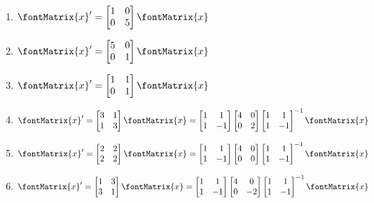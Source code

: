 \begin{enumerate}[label=(\alph*)]
\item\label{itm : Quiz19 a} $\displaystyle \fontMatrix{x}' = \begin{bmatrix}1&0\\0&5\end{bmatrix} \fontMatrix{x}$
\item\label{itm : Quiz19 b} $\displaystyle \fontMatrix{x}' = \begin{bmatrix}5&0\\0&1\end{bmatrix} \fontMatrix{x}$
\item\label{itm : Quiz19 c} $\displaystyle \fontMatrix{x}' = \begin{bmatrix}1&1\\0&1\end{bmatrix} \fontMatrix{x}$
\item\label{itm : Quiz19 d} $\displaystyle \fontMatrix{x}' = \begin{bmatrix}3&1\\1&3\end{bmatrix} \fontMatrix{x} = \begin{bmatrix}1&1\\1&-1\end{bmatrix} \begin{bmatrix}4&0\\0&2\end{bmatrix} \begin{bmatrix}1&1\\1&-1\end{bmatrix}^{-1} \fontMatrix{x}$
\item\label{itm : Quiz19 e} $\displaystyle \fontMatrix{x}' = \begin{bmatrix}2&2\\2&2\end{bmatrix} \fontMatrix{x} = \begin{bmatrix}1&1\\1&-1\end{bmatrix} \begin{bmatrix}4&0\\0&0\end{bmatrix} \begin{bmatrix}1&1\\1&-1\end{bmatrix}^{-1} \fontMatrix{x}$
\item\label{itm : Quiz19 f} $\displaystyle \fontMatrix{x}' = \begin{bmatrix}1&3\\3&1\end{bmatrix} \fontMatrix{x} = \begin{bmatrix}1&1\\1&-1\end{bmatrix} \begin{bmatrix}4&0\\0&-2\end{bmatrix} \begin{bmatrix}1&1\\1&-1\end{bmatrix}^{-1} \fontMatrix{x}$

\end{enumerate}
